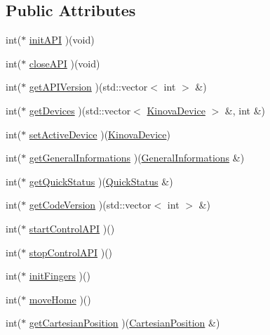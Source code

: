 \subsection*{Public Attributes}
\begin{DoxyCompactItemize}
\item 
int($\ast$ \hyperlink{classjaco_1_1_jaco_a_p_i_a06eae62c9dd3e144cc4275048c3129e6}{init\+A\+PI} )(void)
\item 
int($\ast$ \hyperlink{classjaco_1_1_jaco_a_p_i_a941453ebf5242c5adad823c0636f930f}{close\+A\+PI} )(void)
\item 
int($\ast$ \hyperlink{classjaco_1_1_jaco_a_p_i_a90f1033a1174ea7f97d48186b7ca867a}{get\+A\+P\+I\+Version} )(std\+::vector$<$ int $>$ \&)
\item 
int($\ast$ \hyperlink{classjaco_1_1_jaco_a_p_i_a6f80ab16b2518ecb0ddefcd7183027c1}{get\+Devices} )(std\+::vector$<$ \hyperlink{struct_kinova_device}{Kinova\+Device} $>$ \&, int \&)
\item 
int($\ast$ \hyperlink{classjaco_1_1_jaco_a_p_i_a4e0c8fc007f20e985545b59abf571ea0}{set\+Active\+Device} )(\hyperlink{struct_kinova_device}{Kinova\+Device})
\item 
int($\ast$ \hyperlink{classjaco_1_1_jaco_a_p_i_ae1e29dcccd26e66e34271beff3a52f8c}{get\+General\+Informations} )(\hyperlink{struct_general_informations}{General\+Informations} \&)
\item 
int($\ast$ \hyperlink{classjaco_1_1_jaco_a_p_i_ae4297fe364b296252a1c91efb9024b03}{get\+Quick\+Status} )(\hyperlink{struct_quick_status}{Quick\+Status} \&)
\item 
int($\ast$ \hyperlink{classjaco_1_1_jaco_a_p_i_ab2e6426177bd24cd1a381f0f1a9d277a}{get\+Code\+Version} )(std\+::vector$<$ int $>$ \&)
\item 
int($\ast$ \hyperlink{classjaco_1_1_jaco_a_p_i_a75d269278bf284a368f42ce1f8a3eb2e}{start\+Control\+A\+PI} )()
\item 
int($\ast$ \hyperlink{classjaco_1_1_jaco_a_p_i_a41fefb13b76fc591cde461d1a9b91bb2}{stop\+Control\+A\+PI} )()
\item 
int($\ast$ \hyperlink{classjaco_1_1_jaco_a_p_i_a2e57f45393bda81a7c7c91373a6c6359}{init\+Fingers} )()
\item 
int($\ast$ \hyperlink{classjaco_1_1_jaco_a_p_i_a3f3b46efd241e60665a70505fe1853af}{move\+Home} )()
\item 
int($\ast$ \hyperlink{classjaco_1_1_jaco_a_p_i_a6c3640d554617754a9ed2e875b1a2cd0}{get\+Cartesian\+Position} )(\hyperlink{struct_cartesian_position}{Cartesian\+Position} \&)

\end{DoxyCompactItemize}
